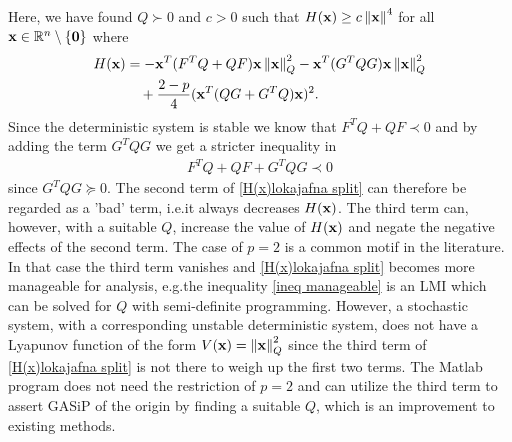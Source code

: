 \documentclass[a4paper,12pt,twoside,BCOR=10mm]{scrbook}
\begin{document}
Here, we have found $Q \succ 0$ and $c > 0$ such that $H(\mathbf{x}) \geq c\left\lVert\mathbf{x}\right\rVert^4$ for all $\mathbf{x} \in \mathbb{R}^{n}\setminus\{\mathbf{0}\}$ where
\begin{align}\label{H(x)lokajafna split}
\begin{split}
    H(\mathbf{x}) &= -\mathbf{x}^T (F^T Q + QF )\mathbf{x}\left\lVert\mathbf{x}\right\rVert_{Q}^{2} -\mathbf{x}^T(G^TQG) \mathbf{x}\left\lVert\mathbf{x}\right\rVert_{Q}^{2}\\
    &\quad+ \frac{2 - p}{4} (\mathbf{x}^T (QG + G^TQ)\mathbf{x})^2.
\end{split}
\end{align}
Since the deterministic system is stable we know that $F^TQ + QF \prec 0$ and by adding the term $G^T QG$ we get a stricter inequality in
\begin{align}\label{ineq manageable}
    F^T Q + QF + G^T Q G \prec 0
\end{align}
since $G^T Q G \succeq 0$. The second term of \eqref{H(x)lokajafna split} can therefore be regarded as a 'bad' term, i.e.\@ it always decreases $H(\mathbf{x})$. The third term can, however, with a suitable $Q$, increase the value of $H(\mathbf{x})$ and negate the negative effects of the second term. The case of $p = 2$ is a common motif in the literature. In that case the third term vanishes and \eqref{H(x)lokajafna split} becomes more manageable for analysis, e.g.\@ the inequality \eqref{ineq manageable} is an LMI which can be solved for $Q$ with semi-definite programming. However, a stochastic system, with a corresponding unstable deterministic system, does not have a Lyapunov function of the form $V(\mathbf{x}) = \left\lVert\mathbf{x}\right\rVert_{Q}^{2}$ since the third term of \eqref{H(x)lokajafna split} is not there to weigh up the first two terms. The Matlab program does not need the restriction of $p = 2$ and can utilize the third term to assert GASiP of the origin by finding a suitable $Q$, which is an improvement to existing methods.
\end{document}
